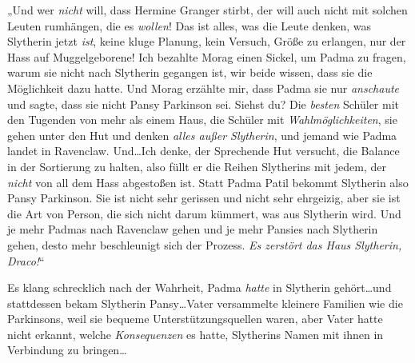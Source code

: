 „Und wer \emph{nicht} will, dass Hermine Granger stirbt, der will auch nicht mit solchen Leuten rumhängen, die es \emph{wollen}! Das ist alles, was die Leute denken, was Slytherin jetzt \emph{ist}, keine kluge Planung, kein Versuch, Größe zu erlangen, nur der Hass auf Muggelgeborene! Ich bezahlte Morag einen Sickel, um Padma zu fragen, warum sie nicht nach Slytherin gegangen ist, wir beide wissen, dass sie die Möglichkeit dazu hatte. Und Morag erzählte mir, dass Padma sie nur \emph{anschaute} und sagte, dass sie nicht Pansy Parkinson sei. Siehst du? Die \emph{besten} Schüler mit den Tugenden von mehr als einem Haus, die Schüler mit \emph{Wahlmöglichkeiten}, sie gehen unter den Hut und denken \emph{alles außer Slytherin}, und jemand wie Padma landet in Ravenclaw. Und…Ich denke, der Sprechende Hut versucht, die Balance in der Sortierung zu halten, also füllt er die Reihen Slytherins mit jedem, der \emph{nicht} von all dem Hass abgestoßen ist. Statt Padma Patil bekommt Slytherin also Pansy Parkinson. Sie ist nicht sehr gerissen und nicht sehr ehrgeizig, aber sie ist die Art von Person, die sich nicht darum kümmert, was aus Slytherin wird. Und je mehr Padmas nach Ravenclaw gehen und je mehr Pansies nach Slytherin gehen, desto mehr beschleunigt sich der Prozess. \emph{Es zerstört das Haus Slytherin, Draco!}“

Es klang schrecklich nach der Wahrheit, Padma \emph{hatte} in Slytherin gehört…und stattdessen bekam Slytherin Pansy…Vater versammelte kleinere Familien wie die Parkinsons, weil sie bequeme Unterstützungsquellen waren, aber Vater hatte nicht erkannt, welche \emph{Konsequenzen} es hatte, Slytherins Namen mit ihnen in Verbindung zu bringen…

